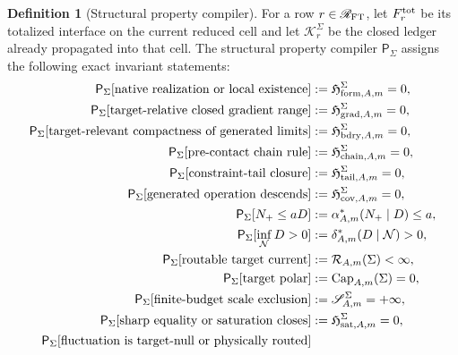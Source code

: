 \documentclass[11pt]{article}
\numberwithin{section}{part}
\theoremstyle{plain}
\theoremstyle{definition}
\newtheorem{definition}[definition]{Definition}
\theoremstyle{remark}
\begin{document}
\begin{definition}[Structural property compiler]
\label{def:structural-property-compiler}
For a row \(r\in\mathscr R_{\rm FT}\), let \(F_r^{\rm tot}\) be its
totalized interface on the current reduced cell and let
\(\mathcal K_r^\Sigma\) be the closed ledger already propagated into that
cell.  The structural property compiler \(\mathsf P_\Sigma\) assigns the
following exact invariant statements:
\begin{align}
 \mathsf P_\Sigma[\text{native realization or local existence}]
   &:=\mathfrak H_{{\rm form},A,m}^{\Sigma}=0,\label{eq:property-compiler-form}\\
 \mathsf P_\Sigma[\text{target-relative closed gradient range}]
   &:=\mathfrak H_{{\rm grad},A,m}^{\Sigma}=0,\label{eq:property-compiler-grad}\\
 \mathsf P_\Sigma[\text{target-relevant compactness of generated limits}]
   &:=\mathfrak H_{{\rm bdry},A,m}^{\Sigma}=0,\label{eq:property-compiler-compact}\\
 \mathsf P_\Sigma[\text{pre-contact chain rule}]
   &:=\mathfrak H_{{\rm chain},A,m}^{\Sigma}=0,\label{eq:property-compiler-chain}\\
 \mathsf P_\Sigma[\text{constraint-tail closure}]
   &:=\mathfrak H_{{\rm tail},A,m}^{\Sigma}=0,\label{eq:property-compiler-tail}\\
 \mathsf P_\Sigma[\text{generated operation descends}]
   &:=\mathfrak H_{{\rm cov},A,m}^{\Sigma}=0,\label{eq:property-compiler-cov}\\
 \mathsf P_\Sigma[N_+\le aD]
   &:=\alpha_{A,m}^*(N_+\mid D)\le a,\label{eq:property-compiler-radius}\\
 \mathsf P_\Sigma[\inf_{\mathcal N}D>0]
   &:=\delta_{A,m}^*(D\mid\mathcal N)>0,\label{eq:property-compiler-gap}\\
 \mathsf P_\Sigma[\text{routable target current}]
   &:=\mathcal R_{A,m}(\Sigma)<\infty,\label{eq:property-compiler-resistance}\\
 \mathsf P_\Sigma[\text{target polar}]
   &:=\operatorname{Cap}_{A,m}(\Sigma)=0,\label{eq:property-compiler-capacity}\\
 \mathsf P_\Sigma[\text{finite-budget scale exclusion}]
   &:=\mathscr S_{A,m}^{\Sigma}=+\infty,\label{eq:property-compiler-scale}\\
 \mathsf P_\Sigma[\text{sharp equality or saturation closes}]
   &:=\mathfrak H_{{\rm sat},A,m}^{\Sigma}=0,\label{eq:property-compiler-sat}\\
 \mathsf P_\Sigma[\text{fluctuation is target-null or physically routed}]

\end{align}
\end{definition}
\end{document}
